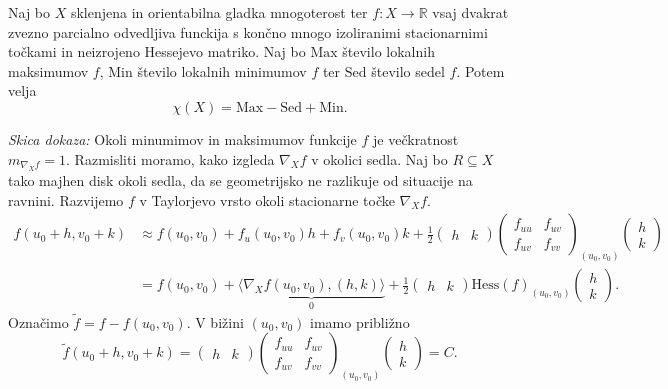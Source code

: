 \begin{izrek}
\label{izr_formula_stacionarnih_tock}
Naj bo $X$ sklenjena in orientabilna gladka mnogoterost ter $f: X \to  \mathbb{R}$ vsaj dvakrat zvezno parcialno odvedljiva funckija s končno mnogo izoliranimi stacionarnimi točkami in neizrojeno Hessejevo matriko.
Naj bo $\text{Max}$ število lokalnih maksimumov $f$, $\text{Min}$ število lokalnih minimumov $f$ ter $\text{Sed}$ število sedel $f$. Potem velja \begin{equation*}
\chi(X) = \text{Max} - \text{Sed} + \text{Min}.
\end{equation*}  
\end{izrek}
\noindent
{\em Skica dokaza:\/}
Okoli minumimov in maksimumov funkcije $f$ je večkratnost $m_{\nabla_X f} = 1$. Razmisliti moramo, kako izgleda $\nabla_X f$ v okolici sedla.
Naj bo $R \subseteq X$ tako majhen disk okoli sedla, da se geometrijsko ne razlikuje od situacije na ravnini. Razvijemo $f$ v Taylorjevo vrsto okoli stacionarne točke $\nabla_X f$. \begin{align*}
f(u_0 + h, v_0 + k) &\approx f(u_0 ,v_0) + f_u(u_0, v_0)h + f_v(u_0, v_0)k + \frac{1}{2} \begin{pmatrix}
  h & k 
\end{pmatrix}
\begin{pmatrix}
  f_{uu} & f_{uv} \\
  f_{uv} & f_{vv}
\end{pmatrix}_{(u_0, v_0)}  
\begin{pmatrix}
  h \\
  k 
\end{pmatrix} \\
&= f(u_0, v_0) + \underbrace{\langle \nabla_X f (u_0, v_0), (h, k) \rangle}_0 +  \frac{1}{2} \begin{pmatrix}
    h & k 
  \end{pmatrix}
  \text{Hess}(f)_{(u_0, v_0)}  
  \begin{pmatrix}
    h \\
    k 
  \end{pmatrix}.\end{align*}  
Označimo $\tilde{f} = f - f(u_0, v_0).$ V bižini $(u_0, v_0)$ imamo približno \begin{equation*}
\tilde{f}(u_0 + h, v_0 + k) = \begin{pmatrix}
    h & k 
  \end{pmatrix}
  \begin{pmatrix}
    f_{uu} & f_{uv} \\
    f_{uv} & f_{vv}
  \end{pmatrix}_{(u_0, v_0)}  
  \begin{pmatrix}
    h \\
    k 
  \end{pmatrix} = C.
\end{equation*}  
